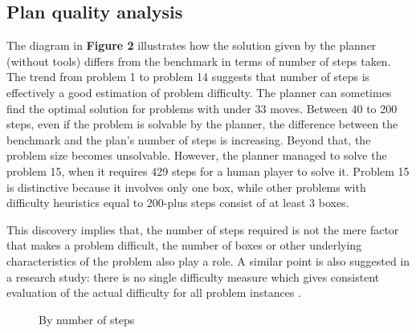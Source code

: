 \documentclass[letterpaper]{article} %
\begin{document}
\subsection{Plan quality analysis}
The diagram in \textbf{Figure 2} illustrates how the solution given by the 
planner (without tools) differs from the benchmark in terms of number 
of steps taken. The trend from problem 1 to problem 14 
suggests that number of steps is effectively a good estimation of 
problem difficulty. The planner can sometimes find the 
optimal solution for problems with under 33 moves. 
Between 40 to 200 steps, even if the problem is solvable 
by the planner, the difference between the benchmark and the 
plan's number of steps is increasing. 
Beyond that, the problem size becomes 
unsolvable. However, the planner managed to solve the
problem 15, when it requires 429 steps for a human player 
to solve it. 
Problem 15 is distinctive because 
it involves only one box, while other problems with difficulty 
heuristics equal to
200-plus steps consist of at least 3 boxes. 

This discovery implies that, the number of steps required is not 
the mere factor that makes a problem difficult, the number of boxes 
or other underlying characteristics of the problem also play a role. 
A similar point is also suggested in a research study: 
there is no single difficulty measure which gives consistent 
evaluation of the actual difficulty for all problem instances
\cite{difficulty-rating}.
\datatableentry
\begin{figure}
\caption{By number of steps}
\end{figure}
\end{document}
